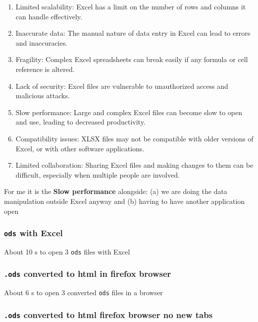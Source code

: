 \documentclass[
  letterpaper,
  DIV=11,
  numbers=noendperiod]{scrartcl}
\begin{document}
\begin{enumerate}
\def\labelenumi{\arabic{enumi}.}
\item
  Limited scalability: Excel has a limit on the number of rows and
  columns it can handle effectively.
\item
  Inaccurate data: The manual nature of data entry in Excel can lead to
  errors and inaccuracies.
\item
  Fragility: Complex Excel spreadsheets can break easily if any formula
  or cell reference is altered.
\item
  Lack of security: Excel files are vulnerable to unauthorized access
  and malicious attacks.
\item
  Slow performance: Large and complex Excel files can become slow to
  open and use, leading to decreased productivity.
\item
  Compatibility issues: XLSX files may not be compatible with older
  versions of Excel, or with other software applications.
\item
  Limited collaboration: Sharing Excel files and making changes to them
  can be difficult, especially when multiple people are involved.
\end{enumerate}

For me it is the \textbf{Slow performance} alongside: (a) we are doing
the data manipulation outside Excel anyway and (b) having to have
another application open

\hypertarget{ods-with-excel}{%
\subsubsection{\texorpdfstring{\texttt{ods} with
Excel}{ods with Excel}}\label{ods-with-excel}}

About 10 s to open 3 \texttt{ods} files with Excel

\hypertarget{ods-converted-to-html-in-firefox-browser}{%
\subsubsection{\texorpdfstring{\texttt{.ods} converted to html in
firefox
browser}{.ods converted to html in firefox browser}}\label{ods-converted-to-html-in-firefox-browser}}

About 6 s to open 3 converted \texttt{ods} files in a browser

\hypertarget{ods-converted-to-html-firefox-browser-no-new-tabs}{%
\subsubsection{\texorpdfstring{\texttt{.ods} converted to html firefox
browser no new
tabs}{.ods converted to html firefox browser no new tabs}}\label{ods-converted-to-html-firefox-browser-no-new-tabs}}
\end{document}
